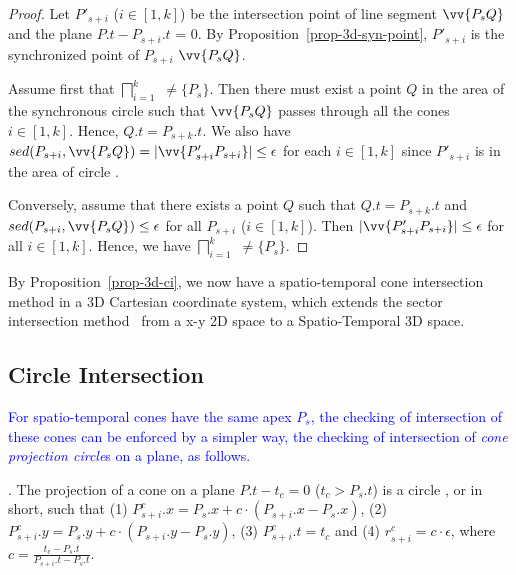 \begin{proof}
Let $P'_{s+i}$ ($i\in[1, k]$) be the intersection point of line segment $\vv{P_sQ}$ and the plane $P.t - P_{s+i}.t$ = $0$.
By Proposition~\ref{prop-3d-syn-point}, $P'_{s+i}$ is the synchronized point of $P_{s+i}$ \wrt $\vv{P_sQ}$.

Assume first that $\bigsqcap_{i=1}^{k}$ $\ne \{P_s\}$. Then there must exist a point $Q $ in the area of the  synchronous circle  such that $\vv{P_sQ}$ passes through all the cones  $i\in[1, k]$. Hence,  $Q.t = P_{s+k}.t$.
We also have $sed(P_{s+i}, \vv{P_sQ}) = |\vv{P'_{s+i}P_{s+i}}| \le \epsilon$ for each $i \in [1, k]$  since $P'_{s+i}$  is in the area of circle  .

Conversely, assume that there exists a point $Q$ such that $Q.t = P_{s+k}.t$ and $sed(P_{s+i}, \vv{P_sQ})\le\epsilon$ for all $P_{s+i}$ ($i \in [1,k]$). Then $|\vv{P'_{s+i}P_{s+i}}| \le \epsilon$ for all $i \in [1, k]$. Hence, we have  $\bigsqcap_{i=1}^{k}$ $\ne \{P_s\}$.
\end{proof}

By Proposition~\ref{prop-3d-ci}, we now have a spatio-temporal cone intersection method in a 3D Cartesian coordinate system, which extends the sector intersection method~\cite{Williams:Longest, Sklansky:Cone, Zhao:Sleeve} {from a x-y 2D space to a Spatio-Temporal 3D space}.


\subsection{Circle Intersection}
\label{subsec-ProjectionCircle}

\textcolor{blue}{For spatio-temporal cones have the same apex $P_s$, the checking of intersection of these cones can be enforced by a simpler way, \ie the checking of intersection of \textit{cone projection circle}s on a plane, as follows.}

. The projection of a cone  on a plane $P.t- t_c = 0$ ($t_c > P_s.t$) is a circle , or  in short, such that
%
(1) $P^c_{s+i}.x = P_s.x +  c\cdot(P_{s+i}.x- P_{s}.x)$,
%
(2) $P^c_{s+i}.y = P_s.y +  c\cdot(P_{s+i}.y- P_{s}.y)$,
%
(3) $P^c_{s+i}.t = t_c$ and
%
(4) $r^c_{s+i} =c\cdot\epsilon$, where $c=\frac{t_c - P_s.t}{P_{s+i}.t - P_s.t}$.


